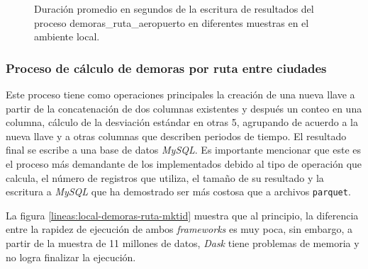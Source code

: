 \begin{figure}
\centering
{}
\caption{Duración promedio en segundos de la escritura de resultados del proceso demoras\_ruta\_aeropuerto en diferentes muestras en el ambiente local.}
\label{lineas:local-demoras-ruta-aeropuerto-write}
\end{figure}

\subsubsection{Proceso de cálculo de demoras por ruta entre ciudades}

Este proceso tiene como operaciones principales la creación de una nueva llave a partir de la concatenación de dos columnas existentes y después un conteo en una columna, cálculo de la desviación estándar en otras 5, agrupando de acuerdo a la nueva llave y a otras columnas que describen periodos de tiempo. El resultado final se escribe a una base de datos \textit{MySQL}. Es importante mencionar que este es el proceso más demandante de los implementados debido al tipo de operación que calcula, el número de registros que utiliza, el tamaño de su resultado y la escritura a \textit{MySQL} que ha demostrado ser más costosa que a archivos \texttt{parquet}.

La figura \ref{lineas:local-demoras-ruta-mktid} muestra que al principio, la diferencia entre la rapidez de ejecución de ambos \textit{frameworks} es muy poca, sin embargo, a partir de la muestra de 11 millones de datos, \textit{Dask} tiene problemas de memoria y no logra finalizar la ejecución.

